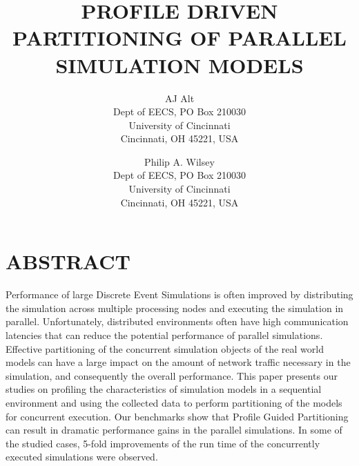 \documentclass{wscpaperproc}
\begin{document}
%
%

\title{PROFILE DRIVEN PARTITIONING OF PARALLEL SIMULATION MODELS}

\author{AJ Alt\\ [12pt]
Dept of EECS, PO Box 210030\\
University of Cincinnati\\
Cincinnati, OH 45221, USA\\
\and
Philip A. Wilsey \\[12pt]
Dept of EECS, PO Box 210030\\
University of Cincinnati\\
Cincinnati, OH 45221, USA
}

\maketitle

\section*{ABSTRACT}

Performance of large Discrete Event Simulations is often improved by distributing the simulation across multiple processing nodes and executing the simulation in parallel. Unfortunately, distributed environments often have high communication latencies that can reduce the potential performance of parallel simulations. Effective partitioning of the concurrent simulation objects of the real world models can have a large impact on the amount of network traffic necessary in the simulation, and consequently the overall performance. This paper presents our studies on profiling the characteristics of simulation models in a sequential environment and using the collected data to perform partitioning of the models for concurrent execution. Our benchmarks show that Profile Guided Partitioning can result in dramatic performance gains in the parallel simulations. In some of the studied cases, 5-fold improvements of the run time of the concurrently executed simulations were observed.
\end{document}
